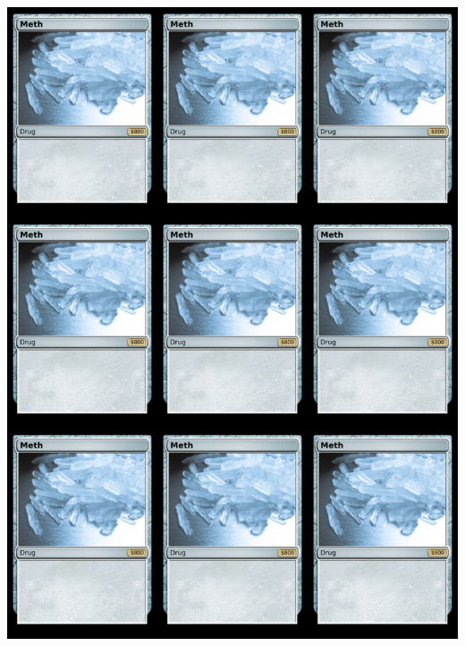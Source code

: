 \documentclass[a4paper]{article}
\begin{document}
\begin{center}
	\centering
	\includegraphics[width=190.5mm,height=266.7mm]{output/temp/page4.png}
\end{center}
\end{document}
